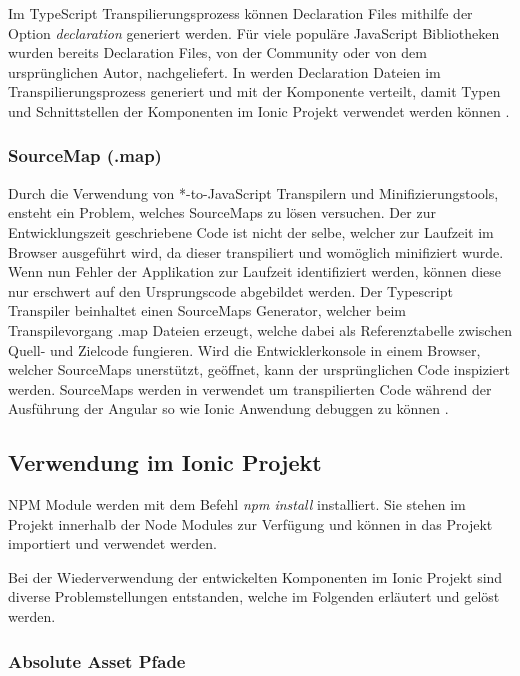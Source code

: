 Im TypeScript Transpilierungsprozess können Declaration Files mithilfe der Option \emph{declaration} generiert werden.
Für viele populäre JavaScript Bibliotheken wurden bereits Declaration Files, von der Community oder von dem ursprünglichen Autor, nachgeliefert.
In \projectname{} werden Declaration Dateien im Transpilierungsprozess generiert und mit der Komponente verteilt,
damit Typen und Schnittstellen der Komponenten im Ionic Projekt verwendet werden können \cite[471]{EssentialTS}.


\subsubsection{SourceMap (.map)}
Durch die Verwendung von *-to-JavaScript Transpilern und Minifizierungstools, ensteht ein Problem, welches SourceMaps zu lösen versuchen.
Der zur Entwicklungszeit geschriebene Code ist nicht der selbe, welcher zur Laufzeit im Browser ausgeführt wird, da dieser transpiliert und womöglich minifiziert wurde.
Wenn nun Fehler der Applikation zur Laufzeit identifiziert werden, können diese nur erschwert auf den Ursprungscode abgebildet werden.
Der Typescript Transpiler beinhaltet einen SourceMaps Generator, welcher beim Transpilevorgang .map Dateien erzeugt,
welche dabei als Referenztabelle zwischen Quell- und Zielcode fungieren.
Wird die Entwicklerkonsole in einem Browser, welcher SourceMaps unerstützt, geöffnet, kann der ursprünglichen Code inspiziert werden.
SourceMaps werden in \projectname{} verwendet um transpilierten Code während der Ausführung der Angular so wie Ionic Anwendung debuggen zu können
 \cite{Using97:online}.



\subsection{Verwendung im Ionic Projekt}
\ac{NPM} Module werden mit dem Befehl \emph{npm install} installiert.
Sie stehen im Projekt innerhalb der Node Modules zur Verfügung und können in das Projekt importiert und verwendet werden.

Bei der Wiederverwendung der entwickelten Komponenten im Ionic Projekt sind diverse Problemstellungen entstanden,
welche im Folgenden erläutert und gelöst werden.

\subsubsection{Absolute Asset Pfade}

